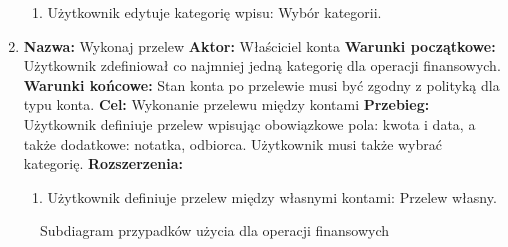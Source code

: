 \begin{enumerate}[labelwidth=\widthof{\ref{last-item}},label=\arabic*.]
\begin{enumerate}[label=\alph*)]
        \item Użytkownik edytuje kategorię wpisu: Wybór kategorii.
    \end{enumerate}
\item \textbf{Nazwa:} Wykonaj przelew \newline
    \textbf{Aktor:} Właściciel konta \newline
    \textbf{Warunki początkowe:} Użytkownik zdefiniował co najmniej jedną kategorię dla operacji finansowych. \newline
    \textbf{Warunki końcowe:} Stan konta po przelewie musi być zgodny z polityką dla typu konta. \newline
    \textbf{Cel:} Wykonanie przelewu między kontami \newline
    \textbf{Przebieg:} Użytkownik definiuje przelew wpisując obowiązkowe pola: kwota i data, a także dodatkowe: notatka, odbiorca. Użytkownik musi także wybrać kategorię. \newline
    \textbf{Rozszerzenia: } %
    \begin{enumerate}[label=\alph*)]
        \item Użytkownik definiuje przelew między własnymi kontami: Przelew własny.
    \end{enumerate}
\end{enumerate}

\begin{figure}[h]
	\centering
	\caption{Subdiagram przypadków użycia dla operacji finansowych}
	\label{fig:use-case-money}
\end{figure}


